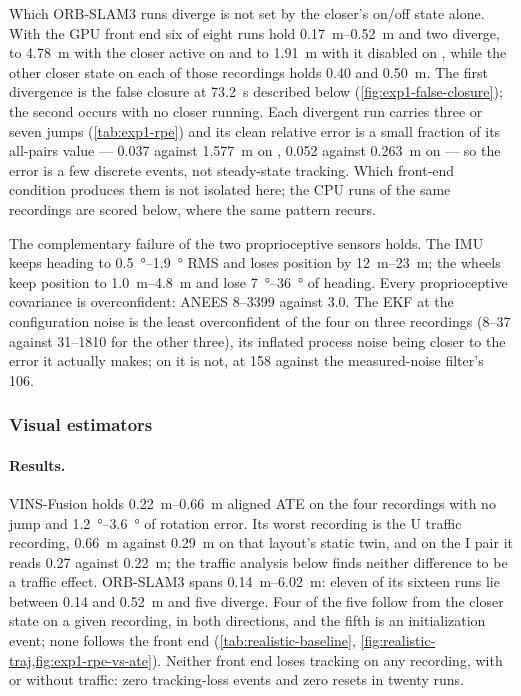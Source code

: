 \documentclass[11pt,a4paper,notitlepage]{report}
\begin{document}
Which ORB-SLAM3 runs diverge is not set by the closer's on/off state alone. With the
GPU front end six of eight runs hold \SIrange{0.17}{0.52}{\metre} and two
diverge, to \SI{4.78}{\metre} with the closer active on 
and to \SI{1.91}{\metre} with it disabled on , while the
other closer state on each of those recordings holds \SI{0.40}{} and
\SI{0.50}{\metre}. The first divergence is the false closure at
\SI{73.2}{\second} described below (\cref{fig:exp1-false-closure}); the second
occurs with no closer running. Each divergent run carries three or seven jumps
(\cref{tab:exp1-rpe}) and its clean relative error is a small fraction of its
all-pairs value --- \SI{0.037}{} against \SI{1.577}{\metre} on
, \SI{0.052}{} against \SI{0.263}{\metre} on
 --- so the error is a few discrete events, not
steady-state tracking. 
Which front-end condition produces them is not isolated here; the CPU runs of
the same recordings are scored below, where the same pattern recurs.

The complementary failure of the two proprioceptive sensors holds. The IMU
keeps heading to \SIrange{0.5}{1.9}{\degree} RMS and loses position by
\SIrange{12}{23}{\metre}; the wheels keep position to \SIrange{1.0}{4.8}{\metre}
and lose \SIrange{7}{36}{\degree} of heading. Every proprioceptive covariance
is overconfident: ANEES \SIrange{8}{3399}{} against 3.0. The EKF at the
configuration noise is the least overconfident of the four on three
recordings (\numrange{8}{37} against \numrange{31}{1810} for the other three), its inflated
process noise being closer to the error it actually makes; on
 it is not, at \num{158} against the measured-noise
filter's \num{106}.

\subsubsection{Visual estimators}

\paragraph{Results.} VINS-Fusion holds \SIrange{0.22}{0.66}{\metre} aligned
ATE on the four recordings with no jump and \SIrange{1.2}{3.6}{\degree} of
rotation error. Its worst recording is the U traffic recording,
\SI{0.66}{\metre} against \SI{0.29}{\metre} on that layout's static twin, and
on the I pair it reads \SI{0.27}{} against \SI{0.22}{\metre}; the traffic
analysis below finds neither difference to be a traffic effect. ORB-SLAM3 spans \SIrange{0.14}{6.02}{\metre}: eleven of its
sixteen runs lie between \SI{0.14}{} and \SI{0.52}{\metre} and five diverge.
Four of the five follow from the closer state on a given recording, in both
directions, and the fifth is an initialization event; none follows the front
end (\cref{tab:realistic-baseline}, \cref{fig:realistic-traj,fig:exp1-rpe-vs-ate}).
Neither front end loses tracking on any recording, with or without traffic:
zero tracking-loss events and zero resets in twenty runs.
\end{document}
